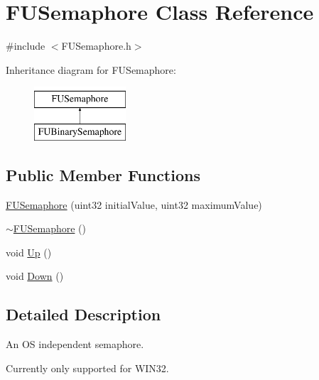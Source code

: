 \hypertarget{classFUSemaphore}{
\section{FUSemaphore Class Reference}
\label{classFUSemaphore}
}


{\ttfamily \#include $<$FUSemaphore.h$>$}

Inheritance diagram for FUSemaphore:\begin{figure}[H]
\begin{center}
\leavevmode
\includegraphics[height=2.000000cm]{classFUSemaphore}
\end{center}
\end{figure}
\subsection*{Public Member Functions}
\begin{DoxyCompactItemize}
\item 
\hyperlink{classFUSemaphore_a500637e0b015a001f806df962e1f7d43}{FUSemaphore} (uint32 initialValue, uint32 maximumValue)
\item 
\hyperlink{classFUSemaphore_aa6e9b5ac7309727e8098ee52ca3cb3f4}{$\sim$FUSemaphore} ()
\item 
void \hyperlink{classFUSemaphore_a9d47923ee3be0bc9ba97407d048ba9bb}{Up} ()
\item 
void \hyperlink{classFUSemaphore_acd9e7cf6338ba21d90656f8a038ec944}{Down} ()
\end{DoxyCompactItemize}


\subsection{Detailed Description}
An OS independent semaphore.

Currently only supported for WIN32. 


